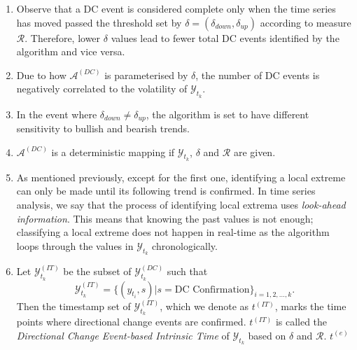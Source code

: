 \begin{enumerate}
    \item Observe that a DC event is considered complete only when the time series has moved passed the threshold set by $\delta = (\delta_{down}, \delta_{up})$ according to measure $\mathcal{R}$. Therefore, lower $\delta$ values lead to fewer total DC events identified by the algorithm and vice versa.
    \item Due to how $\mathcal{A}^{(DC)}$ is parameterised by $\delta$, the number of DC events is negatively correlated to the volatility of $\mathcal{Y}_{t_k}$.
    \item In the event where $\delta_{down} \neq \delta_{up}$, the algorithm is set to have different sensitivity to bullish and bearish trends.
    \item $\mathcal{A}^{(DC)}$ is a deterministic mapping if $\mathcal{Y}_{t_k}$, $\delta$ and $\mathcal{R}$ are given.
    \item As mentioned previously, except for the first one, identifying a local extreme can only be made until its following trend is confirmed. In time series analysis, we say that the process of identifying local extrema uses \textit{look-ahead information}. This means that knowing the past values is not enough; classifying a local extreme does not happen in real-time as the algorithm loops through the values in $\mathcal{Y}_{t_k}$ chronologically.
    \item Let $\mathcal{Y}^{(IT)}_{t_k}$ be the subset of $\mathcal{Y}^{(DC)}_{t_k}$ such that
    \begin{equation*}
        \mathcal{Y}^{(IT)}_{t_k} = \{ (y_{t_i}, s) | s = \text{DC Confirmation} \}_{i = 1, 2, \ldots, k}.
    \end{equation*}
    Then the timestamp set of $\mathcal{Y}^{(IT)}_{t_k}$, which we denote as $t^{(IT)}$, marks the time points where directional change events are confirmed. $t^{(IT)}$ is called the \textit{Directional Change Event-based Intrinsic Time} of $\mathcal{Y}_{t_k}$ based on $\delta$ and $\mathcal{R}$. $t^{(e)}$ 
\end{enumerate}
